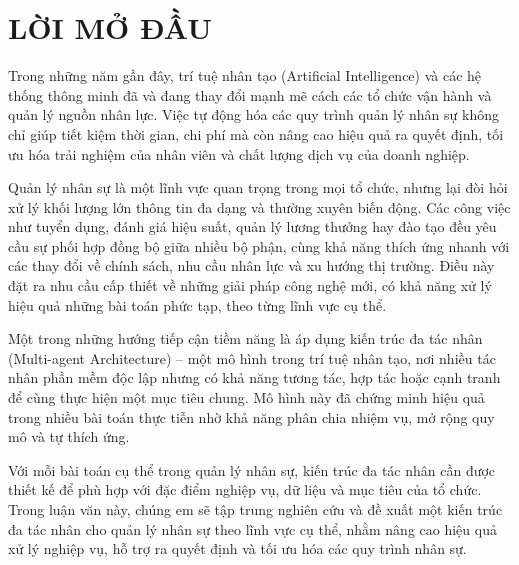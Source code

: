 \documentclass{article}
\begin{document}
\section*{LỜI MỞ ĐẦU}
Trong những năm gần đây, trí tuệ nhân tạo (Artificial Intelligence) và các hệ thống thông minh đã và đang thay đổi mạnh mẽ cách các tổ chức vận hành và quản lý nguồn nhân lực. Việc tự động hóa các quy trình quản lý nhân sự không chỉ giúp tiết kiệm thời gian, chi phí mà còn nâng cao hiệu quả ra quyết định, tối ưu hóa trải nghiệm của nhân viên và chất lượng dịch vụ của doanh nghiệp.

Quản lý nhân sự là một lĩnh vực quan trọng trong mọi tổ chức, nhưng lại đòi hỏi xử lý khối lượng lớn thông tin đa dạng và thường xuyên biến động. Các công việc như tuyển dụng, đánh giá hiệu suất, quản lý lương thưởng hay đào tạo đều yêu cầu sự phối hợp đồng bộ giữa nhiều bộ phận, cùng khả năng thích ứng nhanh với các thay đổi về chính sách, nhu cầu nhân lực và xu hướng thị trường. Điều này đặt ra nhu cầu cấp thiết về những giải pháp công nghệ mới, có khả năng xử lý hiệu quả những bài toán phức tạp, theo từng lĩnh vực cụ thể.

Một trong những hướng tiếp cận tiềm năng là áp dụng kiến trúc đa tác nhân (Multi-agent Architecture) – một mô hình trong trí tuệ nhân tạo, nơi nhiều tác nhân phần mềm độc lập nhưng có khả năng tương tác, hợp tác hoặc cạnh tranh để cùng thực hiện một mục tiêu chung. Mô hình này đã chứng minh hiệu quả trong nhiều bài toán thực tiễn nhờ khả năng phân chia nhiệm vụ, mở rộng quy mô và tự thích ứng.

Với mỗi bài toán cụ thể trong quản lý nhân sự, kiến trúc đa tác nhân cần được thiết kế để phù hợp với đặc điểm nghiệp vụ, dữ liệu và mục tiêu của tổ chức. Trong luận văn này, chúng em sẽ tập trung nghiên cứu và đề xuất một kiến trúc đa tác nhân cho quản lý nhân sự theo lĩnh vực cụ thể, nhằm nâng cao hiệu quả xử lý nghiệp vụ, hỗ trợ ra quyết định và tối ưu hóa các quy trình nhân sự.

\cleardoublepage
{}
{}
\end{document}

